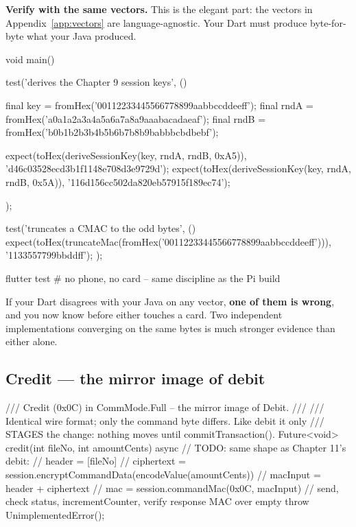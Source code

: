 \begin{verifybox}
\textbf{Verify with the same vectors.} This is the elegant part: the vectors in
Appendix~\ref{app:vectors} are language-agnostic. Your Dart must produce
byte-for-byte what your Java produced.

\begin{dcode}
void main() {
  test('derives the Chapter 9 session keys', () {
    final key  = fromHex('00112233445566778899aabbccddeeff');
    final rndA = fromHex('a0a1a2a3a4a5a6a7a8a9aaabacadaeaf');
    final rndB = fromHex('b0b1b2b3b4b5b6b7b8b9babbbcbdbebf');

    expect(toHex(deriveSessionKey(key, rndA, rndB, 0xA5)),
           'd46c03528ecd3b1f1148e708d3e9729d');
    expect(toHex(deriveSessionKey(key, rndA, rndB, 0x5A)),
           '116d156cc502da820eb57915f189ec74');
  });

  test('truncates a CMAC to the odd bytes', () {
    expect(toHex(truncateMac(fromHex('00112233445566778899aabbccddeeff'))),
           '1133557799bbddff');
  });
}
\end{dcode}

\begin{shell}
flutter test           # no phone, no card -- same discipline as the Pi build
\end{shell}

If your Dart disagrees with your Java on any vector, \textbf{one of them is
wrong}, and you now know before either touches a card. Two independent
implementations converging on the same bytes is much stronger evidence than
either alone.
\end{verifybox}

\subsection{Credit --- the mirror image of debit}

\begin{dcode}
/// Credit (0x0C) in CommMode.Full -- the mirror image of Debit.
///
/// Identical wire format; only the command byte differs. Like debit it only
/// STAGES the change: nothing moves until commitTransaction().
Future<void> credit(int fileNo, int amountCents) async {
  // TODO: same shape as Chapter 11's debit:
  //   header     = [fileNo]
  //   ciphertext = session.encryptCommandData(encodeValue(amountCents))
  //   macInput   = header + ciphertext
  //   mac        = session.commandMac(0x0C, macInput)
  //   send, check status, incrementCounter, verify response MAC over empty
  throw UnimplementedError();
}
\end{dcode}

